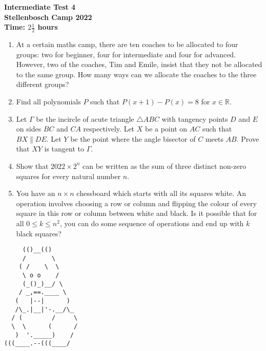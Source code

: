 \documentclass{article}
\begin{document}
\thispagestyle{empty}

\begin{center}
  \textbf{\Large Intermediate Test 4}
  \\ \vspace{1em}
  \textbf{\large Stellenbosch Camp 2022}
  \\ \vspace{1em}
  \textbf{\large Time: $2\frac{1}{2}$ hours}
\end{center}

\bigskip

\begin{enumerate}[itemsep=\fill]

\item %
At a certain maths camp, there are ten coaches to be allocated to four groups: two for beginner, four for intermediate and four for advanced. However, two of the coaches, Tim and Emile, insist that they not be allocated to the same group. How many ways can we allocate the coaches to the three different groups?

 
\item %
Find all polynomials $P$ such that $P(x+1) - P(x) = 8$ for $x\in\mathbb{R}$.

\item %
Let $\Gamma$ be the incircle of acute triangle $\triangle ABC$ with tangency points $D$ and $E$ on sides $BC$ and $CA$ respectively.
Let $X$ be a point on $AC$ such that $BX \parallel DE$.
Let $Y$ be the point where the angle bisector of $C$ meets $AB$.
Prove that $XY$ is tangent to $\Gamma$.


\item %
Show that $2022 \times 2^n$ can be written as the sum of three distinct non-zero squares for every natural number $n$.


\item %
You have an $n \times n$ chessboard which starts with all its squares white.
An operation involves choosing a row or column and flipping the colour of every square in this row or column between white and black.
Is it possible that for all $0 \leq k \leq n^2$, you can do some sequence of operations and end up with $k$ black squares?

\end{enumerate}


\vfill
\centering
\small
\begin{BVerbatim}
     (()__(()
     /       \ 
    ( /    \  \
     \ o o    /
     (_()_)__/ \             
    / _,==.____ \
   (   |--|      )
   /\_.|__|'-.__/\_
  / (        /     \ 
  \  \      (      /
   )  '._____)    /    
(((____.--(((____/
\end{BVerbatim}
\end{document}
